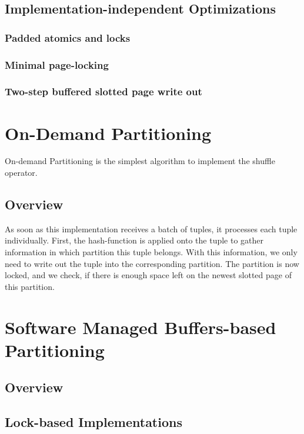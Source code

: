 \subsection{Implementation-independent Optimizations}
\subsubsection{Padded atomics and locks}
\subsubsection{Minimal page-locking}
\subsubsection{Two-step buffered slotted page write out}

\section{On-Demand Partitioning}
On-demand Partitioning is the simplest algorithm to implement the shuffle operator.
\subsection{Overview}
As soon as this implementation receives a batch of tuples, it processes each tuple individually. First, the hash-function is applied onto the tuple to gather information in which partition this tuple belongs. With this information, we only need to write out the tuple into the corresponding partition. The partition is now locked, and we check, if there is enough space left on the newest slotted page of this partition.


\section{Software Managed Buffers-based Partitioning}
\subsection{Overview}
\subsection{Lock-based Implementations}

